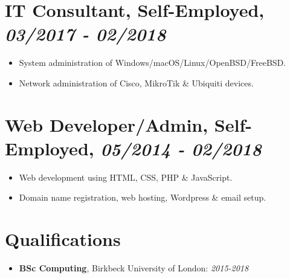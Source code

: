 \documentclass[letterpaper]{article}
\begin{document}
\section{IT Consultant, Self-Employed, \emph{03/2017 - 02/2018}}
\label{sec:org88df412}

\begin{itemize}
\item System administration of Windows/macOS/Linux/OpenBSD/FreeBSD.
\item Network administration of Cisco, MikroTik \& Ubiquiti devices.
\end{itemize}

\section{Web Developer/Admin, Self-Employed, \emph{05/2014 - 02/2018}}
\label{sec:org4df61d9}

\begin{itemize}
\item Web development using HTML, CSS, PHP \& JavaScript.
\item Domain name registration, web hosting, Wordpress \& email setup.
\end{itemize}

\section{Qualifications}
\label{sec:org78d8803}

\begin{itemize}
\item \textbf{BSc Computing}, Birkbeck University of London: \emph{2015-2018}
\end{itemize}
\end{document}
